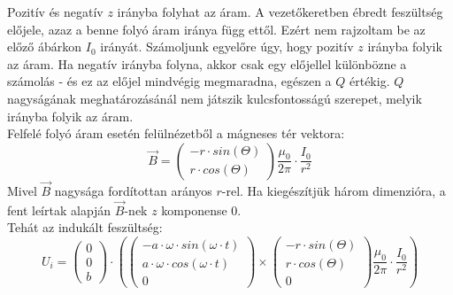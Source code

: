 \documentclass[11pt,a4paper,openany,leqno]{article}
\begin{document}
Pozitív és negatív $z$ irányba folyhat az áram. A vezetőkeretben ébredt feszültség előjele, azaz a benne folyó áram iránya függ ettől. Ezért nem rajzoltam be az előző ábárkon $I_0$ irányát. Számoljunk egyelőre úgy, hogy pozitív $z$ irányba folyik az áram. Ha negatív irányba folyna, akkor csak egy előjellel különbözne a számolás - és ez az előjel mindvégig megmaradna, egészen a $Q$ értékig. $Q$ nagyságának meghatározásánál nem játszik kulcsfontosságú szerepet, melyik irányba folyik az áram.\\ \indent
Felfelé folyó áram esetén felülnézetből a mágneses tér vektora:\\
$$ \vec{B} = \begin{pmatrix} - r \cdot sin(\Theta) \\ r \cdot cos(\Theta) \end{pmatrix} \frac{\mu_0}{2\pi}\cdot \frac{I_0}{r^2} $$ \indent
Mivel $\vec{B}$ nagysága fordítottan arányos $r$-rel. Ha kiegészítjük három dimenzióra, a fent leírtak alapján $\vec{B}$-nek $z$ komponense $0$.\\ \indent
Tehát az indukált feszültség:\\
$$ U_i = \begin{pmatrix} 0 \\ 0 \\ b \end{pmatrix} \cdot ( \begin{pmatrix} - a \cdot \omega \cdot sin(\omega\cdot t) \\ a\cdot \omega \cdot cos(\omega \cdot t) \\ 0 \end{pmatrix} \times \begin{pmatrix} - r \cdot sin(\Theta) \\ r \cdot cos(\Theta)\\0 \end{pmatrix} \frac{\mu_0}{2\pi}\cdot \frac{I_0}{r^2} ) $$
\end{document}
